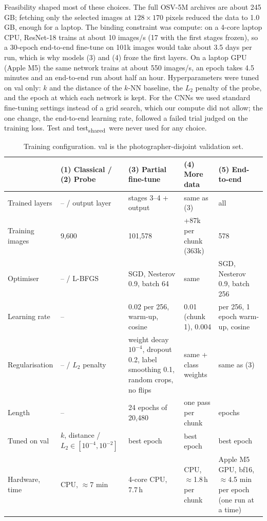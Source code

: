 \documentclass[11pt]{article}
\newcommand{\tsh}{test\textsubscript{shared}}
\begin{document}
Feasibility shaped most of these choices. The full OSV-5M archives are about 245\,GB; fetching only the selected images at $128\times170$ pixels reduced the data to 1.0\,GB, enough for a laptop. The binding constraint was compute: on a 4-core laptop CPU, ResNet-18 trains at about 10 images/s
(17 with the first stages frozen), so a 30-epoch end-to-end fine-tune on 101k images would take about 3.5
days per run, which is why models (3) and (4) froze the first layers. On a laptop GPU (Apple M5) the same
network trains at about 550 images/s, an epoch takes 4.5 minutes and an end-to-end run about half an hour.
Hyperparameters were tuned on val only: $k$ and the distance of the $k$-NN baseline, the $L_2$ penalty of
the probe, and the epoch at which each network is kept. For the CNNs we used standard fine-tuning settings
instead of a grid search, which our compute did not allow; the one change, the end-to-end learning rate,
followed a failed trial judged on the training loss. Test and \tsh\ were never used for any choice.

\begin{table}[!htbp]
\centering\small
\caption{Training configuration. val is the photographer-disjoint validation set.}
\label{tab:config}
\begin{tabularx}{\textwidth}{@{}l>{\raggedright}X>{\raggedright}X>{\raggedright}X>{\raggedright\arraybackslash}X@{}}
\toprule
 & (1) Classical / (2) Probe & (3) Partial fine-tune & (4) More data & (5) End-to-end \\
\midrule
Trained layers & -- / output layer & stages 3--4 + output & same as (3) & all \\
Training images & 9{,}600 & 101{,}578 & +87k per chunk (363k) & 101{,}578 \\
Optimiser & -- / L-BFGS & SGD, Nesterov 0.9, batch 64 & same & SGD, Nesterov 0.9, batch 256 \\
Learning rate & -- & 0.02 per 256, warm-up, cosine & 0.01 (chunk 1), 0.004 & 0.01 per 256, 1 epoch warm-up, cosine \\
Regularisation & -- / $L_2$ penalty & weight decay $10^{-4}$, dropout 0.2, label smoothing 0.1, random crops, no flips & same + class weights & same as (3) \\
Length & -- & 24 epochs of 20{,}480 & one pass per chunk & 6 epochs \\
Tuned on val & $k$, distance / $L_2\in[10^{-4},10^{-2}]$ & best epoch & best epoch & best epoch \\
Hardware, time & CPU, $\approx$7 min & 4-core CPU, 7.7\,h & CPU, $\approx$1.8\,h per chunk & Apple M5 GPU, bf16, $\approx$4.5 min per epoch (one run at a time) \\
\bottomrule
\end{tabularx}
\end{table}
\end{document}

